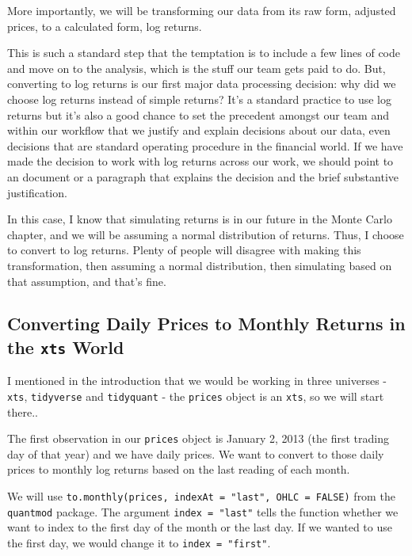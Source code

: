 \documentclass[]{krantz}
\begin{document}
More importantly, we will be transforming our data from its raw form,
adjusted prices, to a calculated form, log returns.

This is such a standard step that the temptation is to include a few
lines of code and move on to the analysis, which is the stuff our team
gets paid to do. But, converting to log returns is our first major data
processing decision: why did we choose log returns instead of simple
returns? It's a standard practice to use log returns but it's also a
good chance to set the precedent amongst our team and within our
workflow that we justify and explain decisions about our data, even
decisions that are standard operating procedure in the financial world.
If we have made the decision to work with log returns across our work,
we should point to an document or a paragraph that explains the decision
and the brief substantive justification.

In this case, I know that simulating returns is in our future in the
Monte Carlo chapter, and we will be assuming a normal distribution of
returns. Thus, I choose to convert to log returns. Plenty of people will
disagree with making this transformation, then assuming a normal
distribution, then simulating based on that assumption, and that's fine.

\subsection*{\texorpdfstring{Converting Daily Prices to Monthly Returns
in the \texttt{xts}
World}{Converting Daily Prices to Monthly Returns in the xts World}}\label{converting-daily-prices-to-monthly-returns-in-the-xts-world}

I mentioned in the introduction that we would be working in three
universes - \texttt{xts}, \texttt{tidyverse} and \texttt{tidyquant} -
the \texttt{prices} object is an \texttt{xts}, so we will start there..

The first observation in our \texttt{prices} object is January 2, 2013
(the first trading day of that year) and we have daily prices. We want
to convert to those daily prices to monthly log returns based on the
last reading of each month.

We will use
\texttt{to.monthly(prices,\ indexAt\ =\ "last",\ OHLC\ =\ FALSE)} from
the \texttt{quantmod} package. The argument \texttt{index\ =\ "last"}
tells the function whether we want to index to the first day of the
month or the last day. If we wanted to use the first day, we would
change it to \texttt{index\ =\ "first"}.
\end{document}
